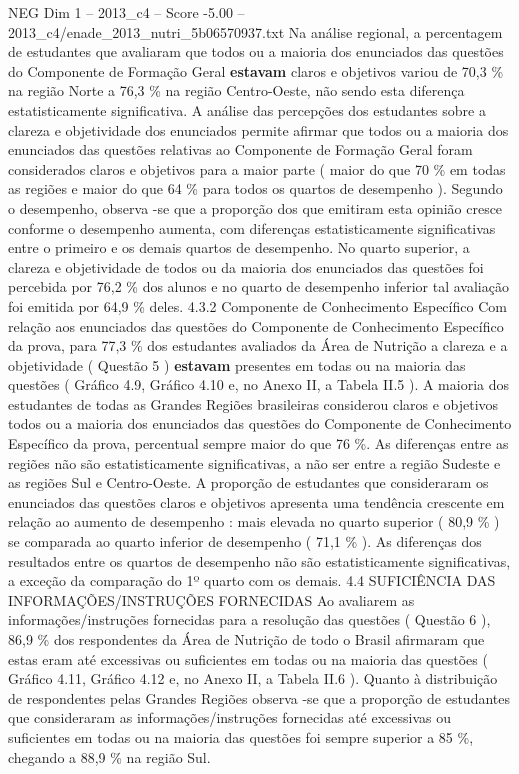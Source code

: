 \begin{textsample}{NEG Dim 1 – 2013\_c4 – Score -5.00 – 2013\_c4/enade\_2013\_nutri\_5b06570937.txt}
Na análise regional, a percentagem de estudantes que avaliaram que todos ou a maioria dos enunciados das questões do Componente de Formação Geral \textbf{estavam} claros e objetivos variou de 70,3 \% na região Norte a 76,3 \% na região Centro-Oeste, não sendo esta diferença estatisticamente significativa.
A análise das percepções dos estudantes sobre a clareza e objetividade dos enunciados permite afirmar que todos ou a maioria dos enunciados das questões relativas ao Componente de Formação Geral foram considerados claros e objetivos para a maior parte ( maior do que 70 \% em todas as regiões e maior do que 64 \% para todos os quartos de desempenho ).
Segundo o desempenho, observa -se que a proporção dos que emitiram esta opinião cresce conforme o desempenho aumenta, com diferenças estatisticamente significativas entre o primeiro e os demais quartos de desempenho.
No quarto superior, a clareza e objetividade de todos ou da maioria dos enunciados das questões foi percebida por 76,2 \% dos alunos e no quarto de desempenho inferior tal avaliação foi emitida por 64,9 \% deles. 4.3.2 Componente de Conhecimento Específico Com relação aos enunciados das questões do Componente de Conhecimento Específico da prova, para 77,3 \% dos estudantes avaliados da Área de Nutrição a clareza e a objetividade ( Questão 5 ) \textbf{estavam} presentes em todas ou na maioria das questões ( Gráfico 4.9, Gráfico 4.10 e, no Anexo II, a Tabela II.5 ).
A maioria dos estudantes de todas as Grandes Regiões brasileiras considerou claros e objetivos todos ou a maioria dos enunciados das questões do Componente de Conhecimento Específico da prova, percentual sempre maior do que 76 \%.
As diferenças entre as regiões não são estatisticamente significativas, a não ser entre a região Sudeste e as regiões Sul e Centro-Oeste.
A proporção de estudantes que consideraram os enunciados das questões claros e objetivos apresenta uma tendência crescente em relação ao aumento de desempenho : mais elevada no quarto superior ( 80,9 \% ) se comparada ao quarto inferior de desempenho ( 71,1 \% ).
As diferenças dos resultados entre os quartos de desempenho não são estatisticamente significativas, a exceção da comparação do 1º quarto com os demais. 4.4 SUFICIÊNCIA DAS INFORMAÇÕES/INSTRUÇÕES FORNECIDAS Ao avaliarem as informações/instruções fornecidas para a resolução das questões ( Questão 6 ), 86,9 \% dos respondentes da Área de Nutrição de todo o Brasil afirmaram que estas eram até excessivas ou suficientes em todas ou na maioria das questões ( Gráfico 4.11, Gráfico 4.12 e, no Anexo II, a Tabela II.6 ).
Quanto à distribuição de respondentes pelas Grandes Regiões observa -se que a proporção de estudantes que consideraram as informações/instruções fornecidas até excessivas ou suficientes em todas ou na maioria das questões foi sempre superior a 85 \%, chegando a 88,9 \% na região Sul.

\end{textsample}
